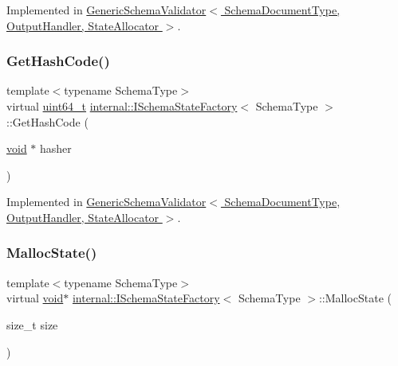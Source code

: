 Implemented in \hyperlink{classGenericSchemaValidator_a4e250737a411af2969a9e585a7da4187}{Generic\+Schema\+Validator$<$ Schema\+Document\+Type, Output\+Handler, State\+Allocator $>$}.

\mbox{\label{classinternal_1_1ISchemaStateFactory_addfcf00963cc777edf642b204f07c8d6}} 
\subsubsection{\texorpdfstring{Get\+Hash\+Code()}{GetHashCode()}}
{\footnotesize\ttfamily template$<$typename Schema\+Type$>$ \\
virtual \hyperlink{stdint_8h_aec6fcb673ff035718c238c8c9d544c47}{uint64\+\_\+t} \hyperlink{classinternal_1_1ISchemaStateFactory}{internal\+::\+I\+Schema\+State\+Factory}$<$ Schema\+Type $>$\+::Get\+Hash\+Code (\begin{DoxyParamCaption}\item[{\hyperlink{imgui__impl__opengl3__loader_8h_ac668e7cffd9e2e9cfee428b9b2f34fa7}{void} $\ast$}]{hasher }\end{DoxyParamCaption})\hspace{0.3cm}{\ttfamily [pure virtual]}}



Implemented in \hyperlink{classGenericSchemaValidator_ac01c45982a1f512e1ca06fe5544b0c0f}{Generic\+Schema\+Validator$<$ Schema\+Document\+Type, Output\+Handler, State\+Allocator $>$}.

\mbox{\label{classinternal_1_1ISchemaStateFactory_ada92ebf8e9ef994f7e20a0f7f9750519}} 
\subsubsection{\texorpdfstring{Malloc\+State()}{MallocState()}}
{\footnotesize\ttfamily template$<$typename Schema\+Type$>$ \\
virtual \hyperlink{imgui__impl__opengl3__loader_8h_ac668e7cffd9e2e9cfee428b9b2f34fa7}{void}$\ast$ \hyperlink{classinternal_1_1ISchemaStateFactory}{internal\+::\+I\+Schema\+State\+Factory}$<$ Schema\+Type $>$\+::Malloc\+State (\begin{DoxyParamCaption}\item[{size\+\_\+t}]{size }\end{DoxyParamCaption})\hspace{0.3cm}{\ttfamily [pure virtual]}}



